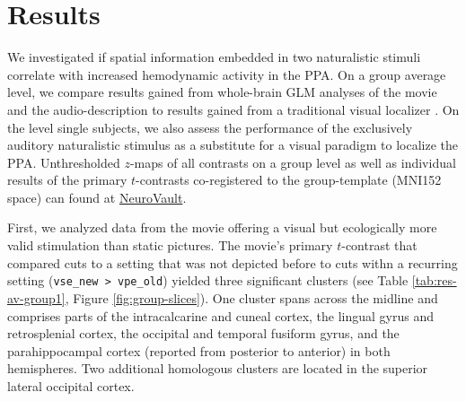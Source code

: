 \documentclass[english]{article}
\begin{document}
\section{Results}




We investigated if spatial information embedded in two naturalistic stimuli
correlate with increased hemodynamic activity in the PPA.
On a group average level, we compare results gained from whole-brain GLM
analyses of the movie and the audio-description to results gained from a
traditional visual localizer \citep{sengupta2016extension}.
On the level single subjects, we also assess the performance of the exclusively
auditory naturalistic stimulus as a substitute for a visual paradigm to localize
the PPA.
Unthresholded $z$-maps of all contrasts on a group level as well as individual
results of the primary $t$-contrasts co-registered to the group-template (MNI152
space) can found at
\href{https://neurovault.org/collections/KADGMGVZ/}{NeuroVault}.

First, we analyzed data from the movie offering a visual but ecologically more
valid stimulation than static pictures.
The movie's primary $t$-contrast that compared cuts to a setting that was not
depicted before to cuts withn a recurring setting (\texttt{vse\_new > vpe\_old})
yielded three significant clusters (see Table \ref{tab:res-av-group1}, Figure
\ref{fig:group-slices}).
One cluster spans across the midline and comprises parts of the intracalcarine
and cuneal cortex, the lingual gyrus and retrosplenial cortex, the occipital and
temporal fusiform gyrus, and the parahippocampal cortex (reported from posterior
to anterior) in both hemispheres.
Two additional homologous clusters are located in the superior lateral occipital
cortex.
\end{document}
